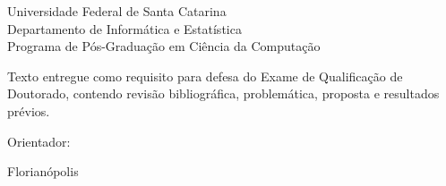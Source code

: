 \thispagestyle{empty}
\begin{center}
\large Universidade Federal de Santa Catarina\\
Departamento de Informática e Estatística\\
Programa de Pós-Graduação em Ciência da Computação
\end{center}

\vspace*{1.5cm}
\begin{center}
\large \aluno
\end{center}


\vspace*{2.3cm}

\begin{center}
{\sc  \tituloTese }
\end{center}

\vspace*{5.5cm}

\begin{flushright}
\begin{minipage}{9.0cm}
\linespread{1}
Texto entregue como requisito para defesa do Exame de Qualificação de
Doutorado, contendo revisão bibliográfica, problemática, proposta e resultados
prévios.



\vspace*{0.5cm}
Orientador: \nomeProf\\

\end{minipage}
\end{flushright}

\null \vfill


\begin{center}
Florianópolis \\ \the\year
\end{center}

